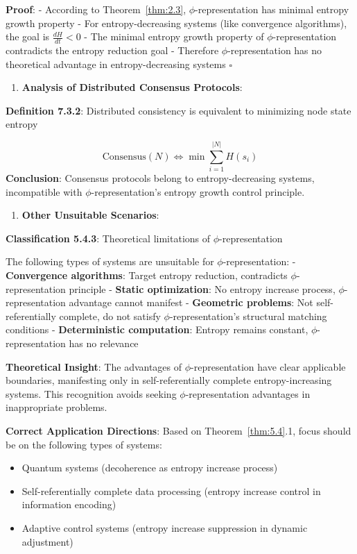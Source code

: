    \textbf{Proof}:
   - According to Theorem~\ref{thm:2.3}, $\phi$-representation has minimal entropy growth property
   - For entropy-decreasing systems (like convergence algorithms), the goal is $\frac{dH}{dt} < 0$
   - The minimal entropy growth property of $\phi$-representation contradicts the entropy reduction goal
   - Therefore $\phi$-representation has no theoretical advantage in entropy-decreasing systems $\square$

\begin{enumerate}
\item \textbf{Analysis of Distributed Consensus Protocols}:
\end{enumerate}
   \textbf{Definition 7.3.2}: Distributed consistency is equivalent to minimizing node state entropy
\label{thm:5.4}
   
\begin{equation}
\text{Consensus}(N) \Leftrightarrow \min \sum_{i=1}^{|N|} H(s_i)
\end{equation}
   \textbf{Conclusion}: Consensus protocols belong to entropy-decreasing systems, incompatible with $\phi$-representation's entropy growth control principle.

\begin{enumerate}
\item \textbf{Other Unsuitable Scenarios}:
\end{enumerate}
   \textbf{Classification 5.4.3}: Theoretical limitations of $\phi$-representation
   
   The following types of systems are unsuitable for $\phi$-representation:
   - \textbf{Convergence algorithms}: Target entropy reduction, contradicts $\phi$-representation principle
   - \textbf{Static optimization}: No entropy increase process, $\phi$-representation advantage cannot manifest
   - \textbf{Geometric problems}: Not self-referentially complete, do not satisfy $\phi$-representation's structural matching conditions
   - \textbf{Deterministic computation}: Entropy remains constant, $\phi$-representation has no relevance

\textbf{Theoretical Insight}:
The advantages of $\phi$-representation have clear applicable boundaries, manifesting only in self-referentially complete entropy-increasing systems. This recognition avoids seeking $\phi$-representation advantages in inappropriate problems.

\textbf{Correct Application Directions}:
Based on Theorem~\ref{thm:5.4}.1, focus should be on the following types of systems:
\begin{itemize}
\item Quantum systems (decoherence as entropy increase process)
\item Self-referentially complete data processing (entropy increase control in information encoding)
\item Adaptive control systems (entropy increase suppression in dynamic adjustment)
\end{itemize}

